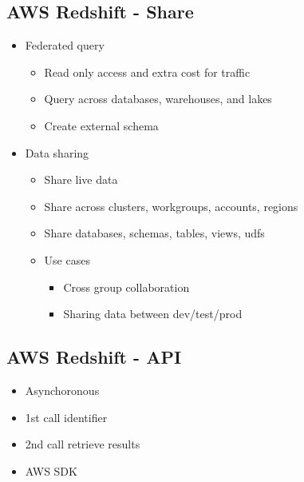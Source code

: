 \documentclass[../main.tex]{subfiles}
\begin{document}
\subsection{AWS Redshift - Share}
\begin{itemize}
    \item Federated query
    \begin{itemize}
        \item Read only access and extra cost for traffic
        \item Query across databases, warehouses, and lakes
        \item Create external schema
    \end{itemize}
    \item Data sharing
    \begin{itemize}
        \item Share live data
        \item Share across clusters, workgroups, accounts, regions
        \item Share databases, schemas, tables, views, udfs
        \item Use cases
        \begin{itemize}
            \item Cross group collaboration
            \item Sharing data between dev/test/prod
        \end{itemize}
    \end{itemize}
\end{itemize}

\subsection{AWS Redshift - API}
\begin{itemize}
    \item Asynchoronous
    \item 1st call identifier
    \item 2nd call retrieve results
    \item AWS SDK
\end{itemize}
\end{document}
